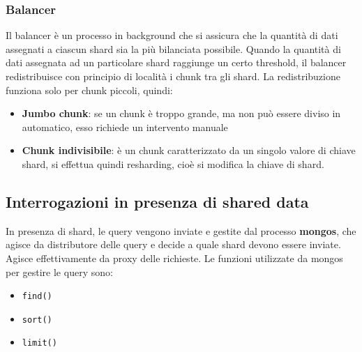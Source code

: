 \documentclass[a4paper,twoside]{article}
\begin{document}
\subsubsection{Balancer}
Il balancer è un processo in background che si assicura che la quantità di dati
assegnati a ciascun shard sia la più bilanciata possibile. Quando la quantità di dati
assegnata ad un particolare shard raggiunge un certo threshold, il balancer 
redistribuisce con principio di località i chunk tra gli shard. La redistribuzione
funziona solo per chunk piccoli, quindi:
\begin{itemize}
  \item \textbf{Jumbo chunk}: se un chunk è troppo grande, ma non può essere diviso
    in automatico, esso richiede un intervento manuale
  \item \textbf{Chunk indivisibile}: è un chunk caratterizzato da un singolo
    valore di chiave shard, si effettua quindi resharding, cioè si modifica la chiave
    di shard.
\end{itemize}

\subsection{Interrogazioni in presenza di shared data}
In presenza di shard, le query vengono inviate e gestite dal processo \textbf{mongos},
che agisce da distributore delle query e decide a quale shard devono essere inviate.
Agisce effettivamente da proxy delle richieste. Le funzioni utilizzate da mongos
per gestire le query sono:
\begin{itemize}
  \item \texttt{find()}
  \item \texttt{sort()}
  \item \texttt{limit()}
\end{itemize}
\end{document}
